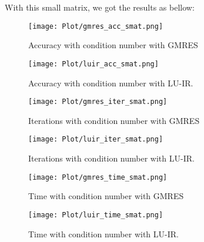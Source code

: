 With this small matrix, we got the results as bellow:
\begin{figure}[ht]
     \begin{minipage}[b]{0.5\linewidth}
        \centering
   \texttt{[image: Plot/gmres\_acc\_smat.png]}
        \caption{Accuracy with condition number with GMRES}
        \label{fig:image1}
    \end{minipage}
    \hspace{0.5cm} 
    \begin{minipage}[b]{0.5\linewidth}
        \centering
        \texttt{[image: Plot/luir\_acc\_smat.png]}
        \caption{Accuracy with condition number with LU-IR.}
        \label{fig:image2}
    \end{minipage}
\end{figure}

\begin{figure}[ht]
     \begin{minipage}[b]{0.5\linewidth}
        \centering
   \texttt{[image: Plot/gmres\_iter\_smat.png]}
        \caption{Iterations with condition number with GMRES}
        \label{fig:image3}
    \end{minipage}
    \hspace{0.5cm} 
    \begin{minipage}[b]{0.5\linewidth}
        \centering
        \texttt{[image: Plot/luir\_iter\_smat.png]}
        \caption{Iterations with condition number with LU-IR.}
        \label{fig:image4}
    \end{minipage}
\end{figure}
\newpage
\begin{figure}[ht]
     \begin{minipage}[b]{0.5\linewidth}
        \centering
   \texttt{[image: Plot/gmres\_time\_smat.png]}
        \caption{Time with condition number with GMRES}
        \label{fig:image5}
    \end{minipage}
    \hspace{0.5cm} 
    \begin{minipage}[b]{0.5\linewidth}
        \centering
        \texttt{[image: Plot/luir\_time\_smat.png]}
        \caption{Time with condition number with LU-IR.}
        \label{fig:image6}
    \end{minipage}
\end{figure}

